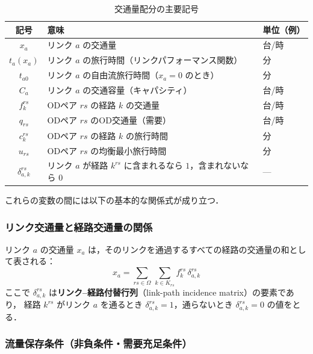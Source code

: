 \begin{table}[hbtp]
  \centering
  \caption{交通量配分の主要記号}
  \label{tab:notation}
  \begin{tabular}{cll}
    \toprule
    記号 & 意味 & 単位（例） \\
    \midrule
    $x_a$            & リンク $a$ の交通量 & 台/時 \\
    $t_a(x_a)$       & リンク $a$ の旅行時間（リンクパフォーマンス関数） & 分 \\
    $t_{a0}$         & リンク $a$ の自由流旅行時間（$x_a=0$ のとき） & 分 \\
    $C_a$            & リンク $a$ の交通容量（キャパシティ） & 台/時 \\
    $f_k^{rs}$       & ODペア $rs$ の経路 $k$ の交通量 & 台/時 \\
    $q_{rs}$         & ODペア $rs$ のOD交通量（需要） & 台/時 \\
    $c_k^{rs}$       & ODペア $rs$ の経路 $k$ の旅行時間 & 分 \\
    $u_{rs}$         & ODペア $rs$ の均衡最小旅行時間 & 分 \\
    $\delta_{a,k}^{rs}$ & リンク $a$ が経路 $k^{rs}$ に含まれるなら $1$，含まれないなら $0$ & — \\
    \bottomrule
  \end{tabular}
\end{table}

これらの変数の間には以下の基本的な関係式が成り立つ\cite{土木学会1998}．

\subsubsection*{リンク交通量と経路交通量の関係}

リンク $a$ の交通量 $x_a$ は，そのリンクを通過するすべての経路の交通量の和として表される：
\begin{equation}
  x_a = \sum_{rs \in \Omega}\, \sum_{k \in K_{rs}} f_k^{rs}\, \delta_{a,k}^{rs}
  \label{eq:link-flow}
\end{equation}
ここで $\delta_{a,k}^{rs}$ は\textbf{リンク–経路付替行列}（link-path incidence matrix）の要素であり，
経路 $k^{rs}$ がリンク $a$ を通るとき $\delta_{a,k}^{rs}=1$，通らないとき $\delta_{a,k}^{rs}=0$ の値をとる．

\subsubsection*{流量保存条件（非負条件・需要充足条件）}

